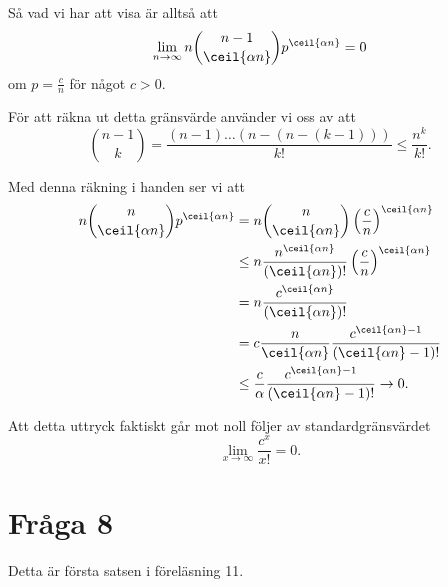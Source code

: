 \documentclass[nobib]{tufte-handout}
\begin{document}
Så vad vi har att visa är alltså att
$$\lim_{n \to \infty} n\binom{n-1}{\ceil{\alpha n}}p^{\ceil{\alpha n}} = 0$$
om $p = \frac{c}{n}$ för något $c > 0$.

För att räkna ut detta gränsvärde använder vi oss av att
$$\binom{n-1}{k} = \frac{(n-1)\ldots(n-(n-(k-1)))}{k!} \leq \frac{n^k}{k!}.$$

Med denna räkning i handen ser vi att
\begin{align*}
    n\binom{n}{\ceil{\alpha n}}p^{\ceil{\alpha n}} &= n\binom{n}{\ceil{\alpha n}}\left(\frac{c}{n}\right)^{\ceil{\alpha n}}\\
    &\leq n\frac{n^{\ceil{\alpha n}}}{(\ceil{\alpha n})!}\left(\frac{c}{n}\right)^{\ceil{\alpha n}}\\
    &= n \frac{c^{\ceil{\alpha n}}}{(\ceil{\alpha n})!}\\
    &= c \frac{n}{\ceil{\alpha n}} \frac{c^{\ceil{\alpha n} - 1}}{(\ceil{\alpha n}-1)!}\\
    &\leq \frac{c}{\alpha}\frac{c^{\ceil{\alpha n} - 1}}{(\ceil{\alpha n}-1)!} \to 0.
\end{align*}

Att detta uttryck faktiskt går mot noll följer av standardgränsvärdet
$$\lim_{x \to \infty} \frac{c^x}{x!} = 0.$$

\section{Fråga 8}

Detta är första satsen i föreläsning 11.

%
%
\end{document}
